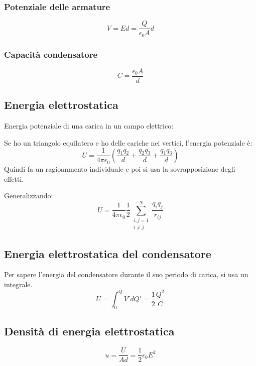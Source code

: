 \subsubsection{Potenziale delle armature}
\begin{equation}
    V = Ed = \frac{Q}{\epsilon_0 A}d
\end{equation}


\subsubsection{Capacità condensatore}
\begin{equation}
    C = \frac{\epsilon_0A}{d}
\end{equation}

\subsection{Energia elettrostatica}
Energia potenziale di una carica in un campo elettrico:

Se ho un triangolo equilatero e ho delle cariche nei vertici, l'energia potenziale è:
\begin{equation*}
    U = \frac{1}{4\pi\epsilon_0}(\frac{q_1q_2}{d} + 
    \frac{q_2q_3}{d} + 
    \frac{q_1q_3}{d})
\end{equation*}
Quindi fa un ragioanmento individuale e poi si usa la sovrapposizione degli effetti.

Generalizzando:
\begin{equation}
    U = \frac{1}{4\pi\epsilon_0}
    \frac{1}{2}
    \sum_{\substack{i,j=1 \\ i\neq j}}^N
    {\frac{q_iq_j}{r_{ij}}}
\end{equation}

\subsection{Energia elettrostatica del condensatore}
Per sapere l'energia del condensatore durante il suo periodo di carica,
si usa un integrale.
\begin{equation}
    U = \int_0^Q{V'dQ' = \frac{1}{2}\frac{Q^2}{C}}
\end{equation}

\subsection{Densità di energia elettrostatica}
\begin{equation}
    u = \frac{U}{Ad}
    = \frac{1}{2}\epsilon_0E^2
\end{equation}


